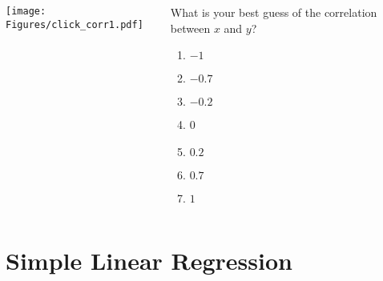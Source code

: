 \begin{frame}
\frametitle{\grp}
\begin{columns}
\texttt{[image: Figures/click\_corr1.pdf]}
\begin{clicker}{What is your best guess of the correlation between $x$ and $y$?}
\begin{enumerate}
    \item
    $-1$
    \item
    $-0.7$
    \item
    $-0.2$
    \item
    0
    \item
    $0.2$
    \item
    $0.7$
    \item
    $1$
\end{enumerate}
\end{clicker}
\end{columns}
\end{frame}

\section[SLR]{Simple Linear Regression}
\begin{frame}
\end{frame}


